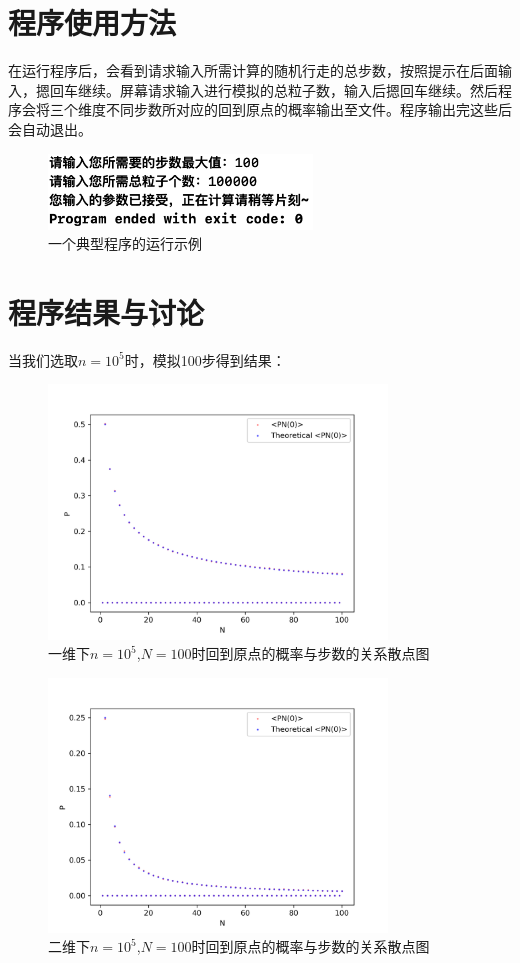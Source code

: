 \documentclass[a4paper,11pt]{article}
\begin{document}
\section{程序使用方法}
在运行程序后，会看到请求输入所需计算的随机行走的总步数，按照提示在后面输入，摁回车继续。屏幕请求输入进行模拟的总粒子数，输入后摁回车继续。然后程序会将三个维度不同步数所对应的回到原点的概率输出至文件。程序输出完这些后会自动退出。

\begin{figure}[!htbp]        
\centering
\includegraphics[width=7cm]{example.png}      
\caption{ 一个典型程序的运行示例}      
\end{figure}


\section{程序结果与讨论}
当我们选取$n=10^{5}$时，模拟100步得到结果：

\begin{figure}[!htbp]        
\centering
\includegraphics[width=9cm]{1-105.png}      
\caption{一维下$n=10^{5}$,$N=100$时回到原点的概率与步数的关系散点图}      
\end{figure}


\begin{figure}[!htbp]        
\centering
\includegraphics[width=9cm]{2-105.png}      
\caption{ 二维下$n=10^{5}$,$N=100$时回到原点的概率与步数的关系散点图}      
\end{figure}
\end{document}
